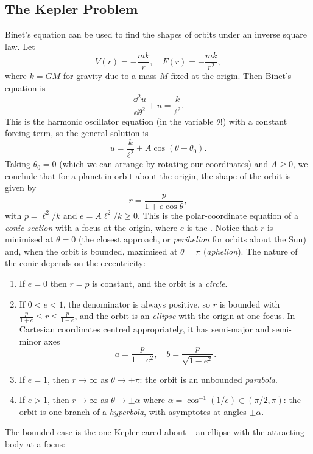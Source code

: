 \documentclass[a4paper]{scrartcl}
\begin{document}
\subsection{The Kepler Problem}

Binet's equation can be used to find the shapes of orbits under an inverse square law. Let
$$
V(r) = -\frac{mk}{r}, \quad F(r) = -\frac{mk}{r^2},
$$
where $k = GM$ for gravity due to a mass $M$ fixed at the origin. Then Binet's equation is
$$
\frac{\dd^2 u}{\dd \theta^2} + u = \frac{k}{\ell^2}.
$$
This is the harmonic oscillator equation (in the variable $\theta$!) with a constant forcing term, so the general solution is
$$
u = \frac{k}{\ell^2} + A \cos(\theta - \theta_0).
$$
Taking $\theta_0 = 0$ (which we can arrange by rotating our coordinates) and $A \geq 0$, we conclude that for a planet in orbit about the origin, the shape of the orbit is given by
$$
r = \frac{p}{1 + e \cos \theta},
$$
with $p = \ell^2/k$ and $e = A \ell^2/k \geq 0$. This is the polar-coordinate equation of a \emph{conic section} with a focus at the origin, where $e$ is the . Notice that $r$ is minimised at $\theta = 0$ (the closest approach, or \emph{perihelion} for orbits about the Sun) and, when the orbit is bounded, maximised at $\theta = \pi$ (\emph{aphelion}). The nature of the conic depends on the eccentricity:
\begin{enumerate}[label=(\roman*)]
	\item If $e = 0$ then $r = p$ is constant, and the orbit is a \emph{circle}.
	\item If $0 < e < 1$, the denominator is always positive, so $r$ is bounded with $\frac{p}{1 + e} \leq r \leq \frac{p}{1 - e}$, and the orbit is an \emph{ellipse} with the origin at one focus. In Cartesian coordinates centred appropriately, it has semi-major and semi-minor axes
	$$
	a = \frac{p}{1 - e^2}, \quad b = \frac{p}{\sqrt{1 - e^2}}.
	$$
	\item If $e = 1$, then $r \to \infty$ as $\theta \to \pm \pi$: the orbit is an unbounded \emph{parabola}.
	\item If $e > 1$, then $r \to \infty$ as $\theta \to \pm \alpha$ where $\alpha = \cos^{-1}(1/e) \in (\pi/2, \pi)$: the orbit is one branch of a \emph{hyperbola}, with asymptotes at angles $\pm\alpha$.
\end{enumerate}

The bounded case is the one Kepler cared about -- an ellipse with the attracting body at a focus:
\end{document}
